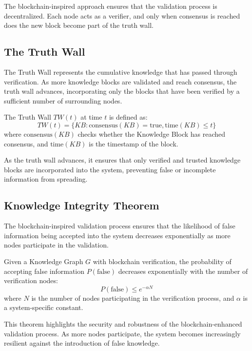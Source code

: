 The blockchain-inspired approach ensures that the validation process is decentralized. Each node acts as a verifier, and only when consensus is reached does the new block become part of the truth wall.

\subsection{The Truth Wall}
The Truth Wall represents the cumulative knowledge that has passed through verification. As more knowledge blocks are validated and reach consensus, the truth wall advances, incorporating only the blocks that have been verified by a sufficient number of surrounding nodes.

\begin{definition}
The Truth Wall $TW(t)$ at time $t$ is defined as:
\begin{equation}
    TW(t) = \{KB : \text{consensus}(KB) = \text{true}, \text{time}(KB) \leq t\}
\end{equation}
where $\text{consensus}(KB)$ checks whether the Knowledge Block has reached consensus, and $\text{time}(KB)$ is the timestamp of the block.
\end{definition}

As the truth wall advances, it ensures that only verified and trusted knowledge blocks are incorporated into the system, preventing false or incomplete information from spreading.

\subsection{Knowledge Integrity Theorem}
The blockchain-inspired validation process ensures that the likelihood of false information being accepted into the system decreases exponentially as more nodes participate in the validation.

\begin{theorem}
Given a Knowledge Graph $G$ with blockchain verification, the probability of accepting false information $P(\text{false})$ decreases exponentially with the number of verification nodes:
\begin{equation}
    P(\text{false}) \leq e^{-\alpha N}
\end{equation}
where $N$ is the number of nodes participating in the verification process, and $\alpha$ is a system-specific constant.
\end{theorem}

This theorem highlights the security and robustness of the blockchain-enhanced validation process. As more nodes participate, the system becomes increasingly resilient against the introduction of false knowledge.

